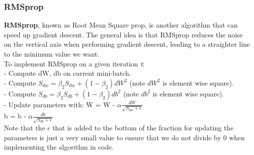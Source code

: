\documentclass[11pt, a4paper]{article}
\begin{document}
\begin{spacing}{1.1}
	\subsubsection{RMSprop}
	\textbf{RMSprop}, known as Root Mean Square prop, is another algorithm that can speed up gradient descent. The general idea is that RMSprop reduces the noise on the vertical axis when performing gradient descent, leading to a straighter line to the minimum value we want. \vspace*{1mm} \\
	To implement RMSprop on a given iteration \textit{t}: \\
	\hspace*{3mm} - Compute dW, db on current mini-batch. \\
	\hspace*{3mm} - Compute $S_{dw} = \beta_2 S_{dw} + (1-\beta_2)dW^2$ (note $dW^2$ is element wise square). \\
	\hspace*{3mm} - Compute $S_{db} = \beta_2 S_{db} + (1-\beta_2)db^2$ (note $db^2$ is element wise square).\\
	\hspace*{3mm} - Update parameters with: W = W - $\alpha \frac{dW}{\sqrt{S_{dw}+ \epsilon}}$ \\
	\hspace*{50mm} b = b - $\alpha \frac{db}{\sqrt{S_{db} + \epsilon}}$ \vspace*{1mm} \\
	Note that the $\epsilon$ that is added to the bottom of the fraction for updating the parameters is just a very small value to ensure that we do not divide by 0 when implementing the algorithm in code. 

\end{spacing}
\end{document}
